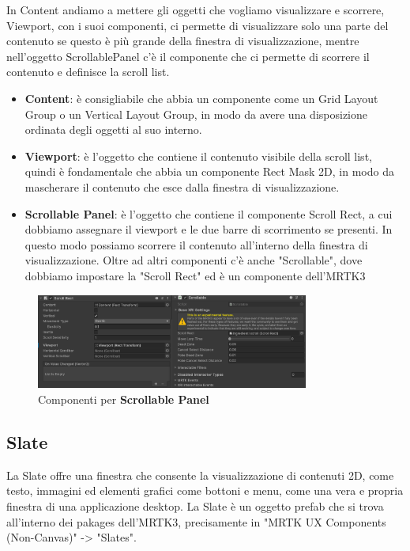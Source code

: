 In Content andiamo a mettere gli oggetti che vogliamo visualizzare e scorrere, Viewport, con i suoi componenti, ci permette di visualizzare solo una parte del contenuto se questo è più grande della finestra di visualizzazione, mentre nell'oggetto ScrollablePanel c'è il componente che ci permette di scorrere il contenuto e definisce la scroll list. 
\begin{itemize}
    \item \textbf{Content}: è consigliabile che abbia un componente come un Grid Layout Group o un Vertical Layout Group, in modo da avere una disposizione ordinata degli oggetti al suo interno.
    \item \textbf{Viewport}: è l'oggetto che contiene il contenuto visibile della scroll list, quindi è fondamentale che abbia un componente Rect Mask 2D, in modo da mascherare il contenuto che esce dalla finestra di visualizzazione.
    \item \textbf{Scrollable Panel}: è l'oggetto che contiene il componente Scroll Rect, a cui dobbiamo assegnare il viewport e le due barre di scorrimento se presenti. In questo modo possiamo scorrere il contenuto all'interno della finestra di visualizzazione. Oltre ad altri componenti c'è anche "Scrollable", dove dobbiamo impostare la "Scroll Rect" ed è un componente dell'MRTK3
\end{itemize}

\begin{figure}[H]
    \centering
    \includegraphics[width=0.8\textwidth,height=\textheight,keepaspectratio]{figures/chapter_1/ComponentiScrollBar.png}
    \caption{Componenti per \textbf{Scrollable Panel}}
\end{figure}

\subsection{Slate}
La Slate offre una finestra che consente la visualizzazione di contenuti 2D, come testo, immagini ed elementi grafici come bottoni e menu, come una vera e propria finestra di una applicazione desktop. La Slate è un oggetto prefab che si trova all'interno dei pakages dell'MRTK3, precisamente in "MRTK UX Components (Non-Canvas)" -> "Slates".

